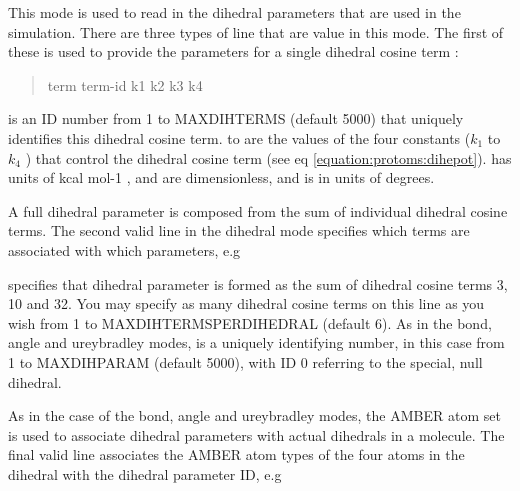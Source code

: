 \documentclass[letterpaper,10pt,english]{sphinxmanual}
\begin{document}
\ignorespaces 
{}

This mode is used to read in the dihedral parameters that are used in the simulation. There are three types of line that are value in this mode. The first of these is used to provide the parameters for a single dihedral cosine term :
\begin{quote}

term term-id k1 k2 k3 k4
\end{quote}

 is an ID number from 1 to MAXDIHTERMS (default 5000) that uniquely identifies this dihedral cosine term.  to  are the values of the four constants (\(k_1\) to \(k_4\) ) that control the dihedral cosine term (see eq \eqref{equation:protoms:dihepot}).  has units of kcal mol-1 ,  and  are dimensionless, and  is in units of degrees.

A full dihedral parameter is composed from the sum of individual dihedral cosine terms. The second valid line in the dihedral mode specifies which terms are associated with which parameters, e.g

%
\begin{sphinxVerbatim}[commandchars=\\\{\}]
    
\end{sphinxVerbatim}

specifies that dihedral parameter  is formed as the sum of dihedral cosine terms 3, 10 and 32. You may specify as many dihedral cosine terms on this line as you wish from 1 to MAXDIHTERMSPERDIHEDRAL (default 6). As in the bond, angle and ureybradley modes,  is a uniquely identifying number, in this case from 1 to MAXDIHPARAM (default 5000), with ID 0 referring to the special, null dihedral.

As in the case of the bond, angle and ureybradley modes, the AMBER atom set is used to associate dihedral parameters with actual dihedrals in a molecule. The final valid line associates the AMBER atom types of the four  atoms in the dihedral with the dihedral parameter ID, e.g

%
\begin{sphinxVerbatim}[commandchars=\\\{\}]
     
\end{sphinxVerbatim}
\end{document}
